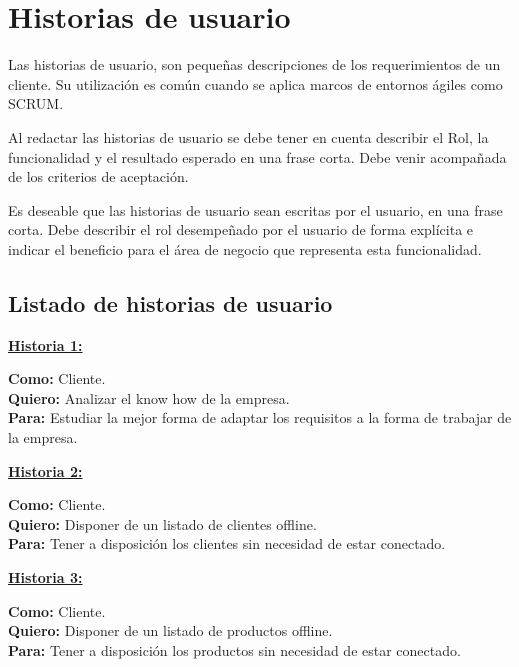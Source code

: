 \section{Historias de usuario}
\setlength{\parindent}{2em}
Las historias de usuario, son pequeñas descripciones de los requerimientos de un cliente. Su utilización es común cuando se aplica marcos de entornos ágiles como SCRUM. 

Al redactar las historias de usuario se debe tener en cuenta describir el Rol, la funcionalidad y el resultado esperado en una frase corta. Debe venir acompañada de los criterios de aceptación.

Es deseable que las historias de usuario sean escritas por el usuario, en una frase corta. Debe describir el rol desempeñado por el usuario de forma explícita e indicar el beneficio para el área de negocio que representa esta funcionalidad. 

\subsection{Listado de historias de usuario}

\begin{shaded}
	\underline{\textbf{Historia 1:}}
	\begin{flushleft}	
		\textbf{Como:} Cliente.\\
		\textbf{Quiero:} Analizar el know how de la empresa.\\
		\textbf{Para:} Estudiar la mejor forma de adaptar los requisitos a la forma de trabajar de la empresa.\\ 
	\end{flushleft}			
\end{shaded}

\begin{shaded}
	\underline{\textbf{Historia 2:}}
	\begin{flushleft}	
		\textbf{Como:} Cliente.\\
		\textbf{Quiero:} Disponer de un listado de clientes offline.\\
		\textbf{Para:} Tener a disposición los clientes sin necesidad de estar conectado.\\ 
	\end{flushleft}			
\end{shaded}

\begin{shaded}
	\underline{\textbf{Historia 3:}}
	\begin{flushleft}	
		\textbf{Como:} Cliente.\\
		\textbf{Quiero:} Disponer de un listado de productos offline.\\
		\textbf{Para:} Tener a disposición los productos sin necesidad de estar conectado.\\ 
	\end{flushleft}			
\end{shaded}

